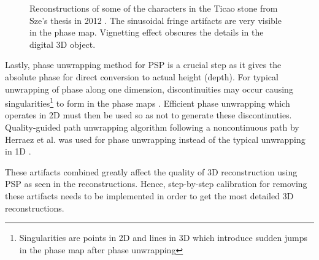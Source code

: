 \captionsetup[figure]{width=5in}
\begin{figure}[h!t]
	\centering
	\caption[Reconstructions from Sze's thesis]{Reconstructions of some of the characters in the Ticao stone from Sze's thesis in 2012 \cite{Sze2012}. The sinusoidal fringe artifacts are very visible in the phase map. Vignetting effect obscures the details in the digital 3D object.}
	\label{fig:sze}
\end{figure}

Lastly, phase unwrapping method for PSP is a crucial step as it gives the absolute phase for direct conversion to actual height (depth). For typical unwrapping of phase along one dimension, discontinuities may occur causing singularities\footnote{Singularities are points in 2D and lines in 3D which introduce sudden jumps in the phase map after phase unwrapping} to form in the phase maps \cite{Ortega2009}.
Efficient phase unwrapping which operates in 2D must then be used so as not to generate these discontinuties. Quality-guided path unwrapping algorithm following a noncontinuous path by Herraez et al. was used for phase unwrapping instead of the typical unwrapping in 1D \cite{Herraez2002}.

These artifacts combined greatly affect the quality of 3D reconstruction using PSP as seen in the reconstructions.
Hence, step-by-step calibration for removing these artifacts needs to be implemented in order to get the most detailed 3D reconstructions. 

